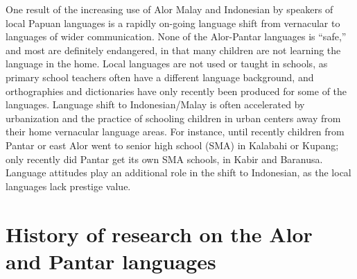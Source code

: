 One result of the increasing use of Alor Malay and Indonesian by speakers of local Papuan languages is a rapidly on-going language shift from vernacular to languages of wider communication. None of the Alor-Pantar languages is ``safe,'' and most are definitely endangered, in that many children are not learning the language in the home. Local languages are not used or taught in schools, as primary school teachers often have a different language background, and orthographies and dictionaries have only recently been produced for some of the languages. Language shift to Indonesian/Malay is often accelerated by urbanization and the practice of schooling children in urban centers away from their home vernacular language areas. For instance, until recently children from Pantar or east Alor went to senior high school (SMA) in Kalabahi or Kupang; only recently did Pantar get its own SMA schools, in Kabir and Baranusa. Language attitudes play an additional role in the shift to Indonesian, as the local languages lack prestige value.

\section{History of research on the Alor and Pantar languages}\label{sec:1:3}

